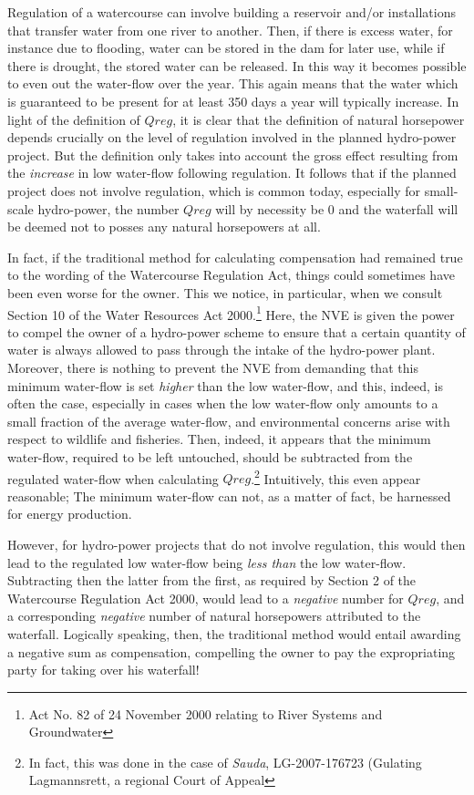 Regulation of a watercourse can involve building a reservoir and/or installations that transfer water from one river to another. Then, if there is excess water, for instance due to flooding, water can be stored in the dam for later use, while if there is drought, the stored water can be released. In this way it becomes possible to even out the water-flow over the year. This again means that the water which is guaranteed to be present for at least 350 days a year will typically increase. In light of the definition of $Qreg$, it is clear that the definition of natural horsepower depends crucially on the level of regulation involved in the planned hydro-power project. But the definition only takes into account the gross effect resulting from the \emph{increase} in low water-flow following regulation. It follows that if the planned project does not involve regulation, which is common today, especially for small-scale hydro-power, the number $Qreg$ will by necessity be $0$ and the waterfall will be deemed not to posses any natural horsepowers at all.

In fact, if the traditional method for calculating compensation had remained true to the wording of the Watercourse Regulation Act, things could sometimes have been even worse for the owner. This we notice, in particular, when we  consult Section 10 of the Water Resources Act 2000.\footnote{Act No. 82 of 24 November 2000 relating to River Systems and Groundwater} Here, the NVE is given the power to compel the owner of a hydro-power scheme to ensure that a certain quantity of water is always allowed to pass through the intake of the hydro-power plant. Moreover, there is nothing to prevent the NVE from demanding that this minimum water-flow is set \emph{higher} than the low water-flow, and this, indeed, is often the case, especially in cases when the low water-flow only amounts to a small fraction of the average water-flow, and environmental concerns arise with respect to wildlife and fisheries. Then, indeed, it appears that the minimum water-flow, required to be left untouched, should be subtracted from the regulated water-flow when calculating $Qreg$.\footnote{In fact, this was done in the case of \emph{Sauda}, LG-2007-176723 (Gulating Lagmannsrett, a regional Court of Appeal} Intuitively, this even appear reasonable; The minimum water-flow can not, as a matter of fact, be harnessed for energy production.

However, for hydro-power projects that do not involve regulation, this would then lead to the regulated low water-flow being \emph{less than} the low water-flow. Subtracting then the latter from the first, as required by Section 2 of the Watercourse Regulation Act 2000, would lead to a \emph{negative} number for $Qreg$, and a corresponding \emph{negative} number of natural horsepowers attributed to the waterfall. Logically speaking, then, the traditional method would entail awarding a negative sum as compensation, compelling the owner to pay the expropriating party for taking over his waterfall!

